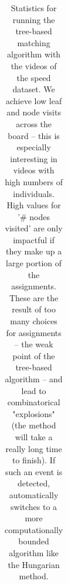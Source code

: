 \documentclass[9pt,lineno]{elife}
\newcommand{\tableref}[1]{\textit{\textbf{\ref{tab:#1}}}\xspace}
\newcommand{\TRex}{\protect\path{TRex}}
\begin{document}
\begin{table}
\begin{tabular}{l l | l l l}
\bottomrule
\end{tabular}
\medskip 
\caption{\label{tab:matching_stats} Statistics for running the tree-based matching algorithm with the videos of the speed dataset. We achieve low leaf and node visits across the board -- this is especially interesting in videos with high numbers of individuals. High values for '\# nodes visited' are only impactful if they make up a large portion of the assignments. These are the result of too many choices for assignments -- the weak point of the tree-based algorithm -- and lead to combinatorical "explosions" (the method will take a really long time to finish). If such an event is detected, \TRex{} automatically switches to a more computationally bounded algorithm like the Hungarian method.}
\end{table}
\end{document}
